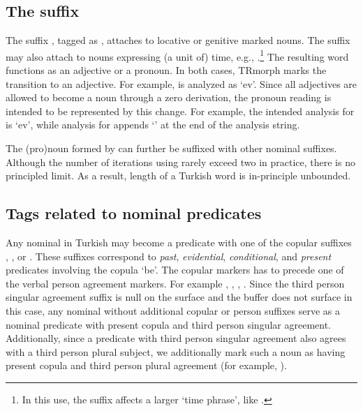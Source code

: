 \documentclass[twocolumn]{article}
\begin{document}
\subsection{\label{ssec:ki}The suffix }

The suffix , tagged as , attaches to locative
or genitive marked nouns. The suffix may also attach to nouns expressing 
(a unit of) time, e.g., .\footnote{In this use,
the suffix affects a larger `time phrase', like .} The resulting word functions as an
adjective or a pronoun. In both cases, TRmorph marks the transition to
an adjective. For example,  is analyzed as
`ev'. Since all adjectives are
allowed to become a noun through a zero derivation, the pronoun
reading is intended to be represented by this change. For example, the
intended analysis for  is
`ev',
while analysis for  appends `' at the end of the analysis
string.

The (pro)noun formed by  can further be suffixed with other
nominal suffixes. Although the number of iterations using 
rarely exceed two in practice, there is no principled limit.  As a
result, length of a Turkish word is in-principle unbounded. 

\subsection{\label{ssec:nompred}Tags related to nominal predicates}

Any nominal in Turkish may become a predicate with one of the
copular suffixes , ,  or
. These suffixes correspond to \emph{past},
\emph{evidential}, \emph{conditional}, and \emph{present} predicates
involving the copula `be'. The copular markers has to precede one of
the verbal person agreement markers. For example
,
,
,
. Since the third person
singular agreement suffix is null on the surface and the buffer
 does not surface in this case, any nominal without
additional copular or person suffixes serve as a nominal predicate
with present copula and third person singular agreement. Additionally,
since a predicate with third person singular agreement also agrees
with a third person plural subject, we additionally mark such a noun
as having present copula and third person plural agreement (for
example, ). 
\end{document}
